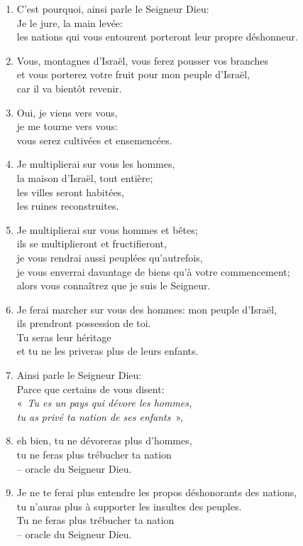 \begin{enumerate}[leftmargin=\psleftmargin, labelsep = \pslabelsep, label={\arabic*}, font=\color{\pscolor}\small\textsuperscript, parsep=0em, itemsep=0em, topsep=0em ]
    \item  C’est pourquoi, ainsi parle le Seigneur Dieu: \\ Je le jure, la main levée: \\ les nations qui vous entourent porteront leur propre déshonneur.\verseSpace
    \item  Vous, montagnes d’Israël, vous ferez pousser vos branches \\ et vous porterez votre fruit pour mon peuple d’Israël, \\ car il va bientôt revenir.
    \item  Oui, je viens vers vous, \\ je me tourne vers vous: \\ vous serez cultivées et ensemencées.
    \item  Je multiplierai sur vous les hommes, \\ la maison d’Israël, tout entière; \\ les villes seront habitées, \\ les ruines reconstruites.
    \item  Je multiplierai sur vous hommes et bêtes; \\ ils se multiplieront et fructifieront, \\ je vous rendrai aussi peuplées qu’autrefois, \\ je vous enverrai davantage de biens qu’à votre commencement; \\ alors vous connaîtrez que je suis le Seigneur.
    \item  Je ferai marcher sur vous des hommes: mon peuple d’Israël, \\ ils prendront possession de toi. \\ Tu seras leur héritage \\ et tu ne les priveras plus de leurs enfants. \parSpace
    \item  Ainsi parle le Seigneur Dieu: \\ Parce que certains de vous disent: \\
          \decalage «~\textit{Tu es un pays qui dévore les hommes, \\ \decalage tu as privé ta nation de ses enfants}~»,
    \item  eh bien, tu ne dévoreras plus d’hommes, \\ tu ne feras plus trébucher ta nation \\ – oracle du Seigneur Dieu.
    \item  Je ne te ferai plus entendre les propos déshonorants des nations, \\ tu n’auras plus à supporter les insultes des peuples. \\
    Tu ne feras plus trébucher ta nation \\ – oracle du Seigneur Dieu. \parSpace

\end{enumerate}
